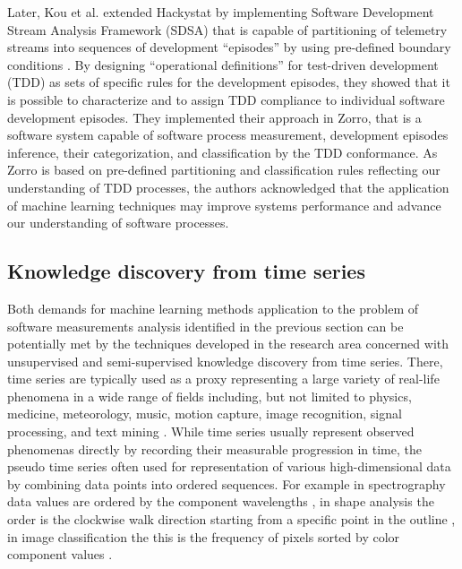 Later, Kou et al. extended Hackystat by implementing Software Development Stream Analysis Framework (SDSA) 
that is capable of partitioning of telemetry streams into sequences of development ``episodes'' by using 
pre-defined boundary conditions \cite{citeulike:6180831} \cite{citeulike:11538873}.
By designing ``operational definitions'' for test-driven development (TDD) as sets of specific rules for 
the development episodes, they showed that it is possible to characterize and to assign TDD compliance to 
individual software development episodes.
They implemented their approach in Zorro, that is a software system capable of software process measurement, 
development episodes inference, their categorization, and classification by the TDD conformance. 
As Zorro is based on pre-defined partitioning and classification rules reflecting our understanding of 
TDD processes, the authors acknowledged that the application of machine learning techniques may improve 
systems performance and advance our understanding of software processes.

%
%
\subsection{Knowledge discovery from time series}
Both demands for machine learning methods application to the problem of software measurements analysis
identified in the previous section can be potentially met by the techniques developed in the research 
area concerned with unsupervised and semi-supervised knowledge discovery from time series.
There, time series are typically used as a proxy representing a large variety of real-life 
phenomena in a wide range of fields including, but not limited to physics, medicine, meteorology, music, 
motion capture, image recognition, signal processing, and text mining \cite{citeulike:11796594}. 
While time series usually represent observed phenomenas directly by recording their measurable 
progression in time, the pseudo time series often used for representation of various high-dimensional 
data by combining data points into ordered sequences. 
For example in spectrography data values are ordered by the component wavelengths \cite{citeulike:12550833},
in shape analysis the order is the clockwise walk direction starting from a specific point in the outline 
\cite{citeulike:12550835}, in image classification the this is the frequency of pixels sorted by color component 
values \cite{citeulike:2900542}.

